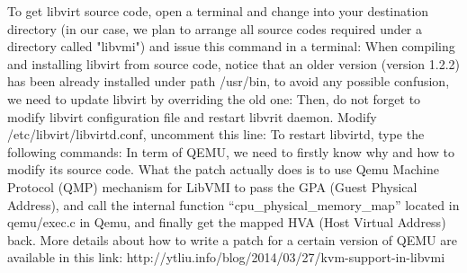 To get libvirt source code, open a terminal and change into your destination directory (in our case, we plan to arrange 
all source codes required under a directory called "libvmi") and issue this command in a terminal:
When compiling and installing libvirt from source code, notice that an older version (version 1.2.2) has been already 
installed under path /usr/bin, to avoid any possible confusion, we need to update libvirt by overriding the old one:
Then, do not forget to modify libvirt configuration file and restart libvrit daemon. Modify /etc/libvirt/libvirtd.conf, uncomment this line:
To restart libvirtd, type the following commands:
In term of QEMU, we need to firstly know why and how to modify its source code. What the patch actually does is to use 
Qemu Machine Protocol (QMP) mechanism for LibVMI to pass the GPA (Guest Physical Address), and call the internal function 
``cpu\_physical\_memory\_map'' located in qemu/exec.c in Qemu, and finally get the mapped HVA (Host Virtual Address) back. More details about how to write a patch for a certain version of QEMU are available in this link: http://ytliu.info/blog/2014/03/27/kvm-support-in-libvmi

